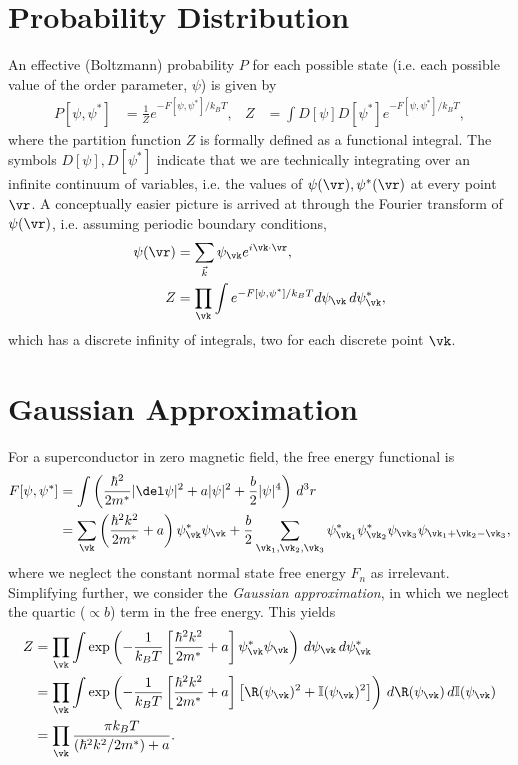 \documentclass[a4paper, 11pt, normalem]{report}
\begin{document}
\section{Probability Distribution}
An effective (Boltzmann) probability $P$ for each possible state (i.e. each possible value of the order parameter, $\psi$) is given by
\begin{align}
    P[\psi,\psi^*] &= \frac{1}{Z}e^{-F[\psi,\psi^*]/k_BT}, & Z &= \int D[\psi]D[\psi^*]e^{-F[\psi,\psi^*]/k_BT},
\end{align}
where the partition function $Z$ is formally defined as a functional integral.
The symbols $D[\psi],D[\psi^*]$ indicate that we are technically integrating over an infinite continuum of variables, i.e. the values of $\psi(\vr),\psi^*(\vr)$ at every point $\vr$.
A conceptually easier picture is arrived at through the Fourier transform of $\psi(\vr)$, i.e. assuming periodic boundary conditions,
\begin{align}
    \psi(\vr) &= \sum_{\vec{k}}\psi_{\vk}e^{i\vk\cdot\vr}, \\
    Z &= \prod_{\vk} \int e^{-F[\psi,\psi^*]/k_BT} d\psi_{\vk}\,d\psi^{*}_{\vk},
\end{align}
which has a discrete infinity of integrals, two for each discrete point $\vk$.

\section{Gaussian Approximation}
For a superconductor in zero magnetic field, the free energy functional is
\begin{align}
    F[\psi,\psi^*] &= \int \left(\frac{\hbar^2}{2m^*}|\del\psi|^2 + a|\psi|^2 + \frac{b}{2}|\psi|^4\right)\,d^3r \\
                   &= \sum_{\vk} \left(\frac{\hbar^2k^2}{2m^*}+a\right)\psi^*_{\vk}\psi_{\vk} + \frac{b}{2}\sum_{\vk_1,\vk_2,\vk_3} \psi^*_{\vk_1}\psi^*_{\vk_2}\psi_{\vk_3}\psi_{\vk_1+\vk_2-\vk_3},
\end{align}
where we neglect the constant normal state free energy $F_n$ as irrelevant.
Simplifying further, we consider the \emph{Gaussian approximation}, in which we neglect the quartic ($\propto b$) term in the free energy.
This yields
\begin{align}
    \begin{split}
    Z &= \prod_{\vk}\int \exp\left(-\frac{1}{k_BT}\left[\frac{\hbar^2k^2}{2m^*}+a\right]\psi^*_{\vk}\psi_{\vk}\right)\,d\psi_{\vk}\,d\psi^*_{\vk} \\
      &= \prod_{\vk}\int \exp\left(-\frac{1}{k_BT}\left[\frac{\hbar^2k^2}{2m^*}+a\right]\left[\R(\psi_{\vk})^2+\mathbb{I}(\psi_{\vk})^2\right]\right)\,d\R(\psi_{\vk})\,d\mathbb{I}(\psi_{\vk}) \\
      &= \prod_{\vk}\frac{\pi k_BT}{(\hbar^2k^2/2m^*)+a}.
    \end{split}
\end{align}
\end{document}
